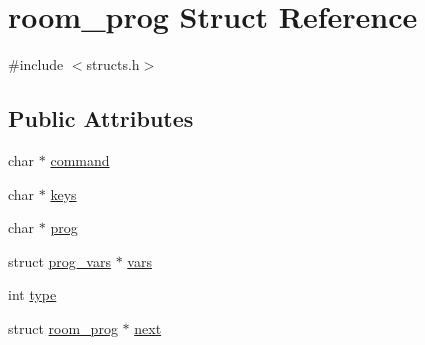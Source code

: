 \hypertarget{structroom__prog}{\section{room\-\_\-prog Struct Reference}
\label{structroom__prog}
}


{\ttfamily \#include $<$structs.\-h$>$}

\subsection*{Public Attributes}
\begin{DoxyCompactItemize}
\item 
char $\ast$ \hyperlink{structroom__prog_a785c039ae10bd7e7fdac5c9b8a048cd1}{command}
\item 
char $\ast$ \hyperlink{structroom__prog_a97a2bb1c30f4b7f1af4d5dd3aac64693}{keys}
\item 
char $\ast$ \hyperlink{structroom__prog_a879dff7e316425c48fee99392d5c06f5}{prog}
\item 
struct \hyperlink{structprog__vars}{prog\-\_\-vars} $\ast$ \hyperlink{structroom__prog_a3f846626322a515475608f1b328b1528}{vars}
\item 
int \hyperlink{structroom__prog_ad84ce03878d550aa9d2d5beb81871e04}{type}
\item 
struct \hyperlink{structroom__prog}{room\-\_\-prog} $\ast$ \hyperlink{structroom__prog_afa84c0c83a57a395e7d7bb1645741f6c}{next}
\end{DoxyCompactItemize}



